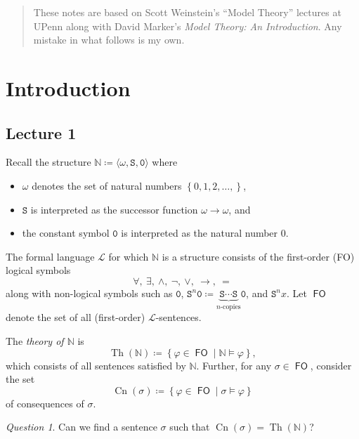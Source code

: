 \documentclass[10pt,letterpaper,cm]{nupset}
\theoremstyle{definition}
\theoremstyle{theorem}
\theoremstyle{remark}
\newtheorem*{question}{Question}
\newcommand{\N}{\mathbb N}
\renewcommand{\S}{\mathtt S}
\newcommand{\1}{\mathbf{1}}
\newcommand{\0}{\mathsf 0}
\DeclareMathOperator{\fo}{\mathsf{FO}}
\DeclareMathOperator{\thh}{Th}
\DeclareMathOperator{\cn}{Cn}
\begin{document}
\thispagestyle{empty}
\begin{abstract}
These notes are based on Scott Weinstein's ``Model Theory'' lectures at UPenn along with David Marker's \textit{Model Theory: An Introduction}. Any mistake in what follows is my own.
\end{abstract}

\tableofcontents
\newpage

\section{Introduction}
\subsection{Lecture 1}

Recall the structure $\N \coloneqq \langle \omega, \S, \mathtt{0}\rangle$ where 
\begin{itemize}
\item $\omega$ denotes the set of natural numbers $\left\{0,1,2,\ldots,\right\}$, 
\item $\S$ is interpreted as the successor function $\omega \to \omega$, and 
\item the constant symbol $\mathtt{0}$ is interpreted as the natural number $0$.
\end{itemize}

The formal language $\mathcal{L}$ for which $\N$ is a structure consists of the first-order (FO) logical symbols
\[
\forall, \ \exists, \ \land,\ \neg,\ \vee,\ \rightarrow, \ =
\]
along with non-logical symbols such as $\mathtt{0}$, $\S^n{\mathtt{0}}\coloneqq \underbrace{\S\cdots \S}_{n\text{-copies}}{\mathtt{0}}$, and $\S^n{x}$. Let $\fo$ denote the set of all (first-order) $\mathcal{L}$-sentences. 

\smallskip

The \textit{theory of $\N$} is 
\[
\thh(\N) \coloneqq \left\{\varphi \in \fo \mid \N \models \varphi \right\},
\] which consists of all sentences satisfied by $\N$. Further, for any $\sigma \in \fo$, consider the set $$\cn(\sigma)  \coloneqq \left\{\varphi \in \fo \mid \sigma \models \varphi\right\}$$ of consequences of $\sigma$.

\begin{question}
Can we find a sentence $\sigma$ such that $\cn(\sigma) = \thh(\N)$?
\end{question}
\end{document}
